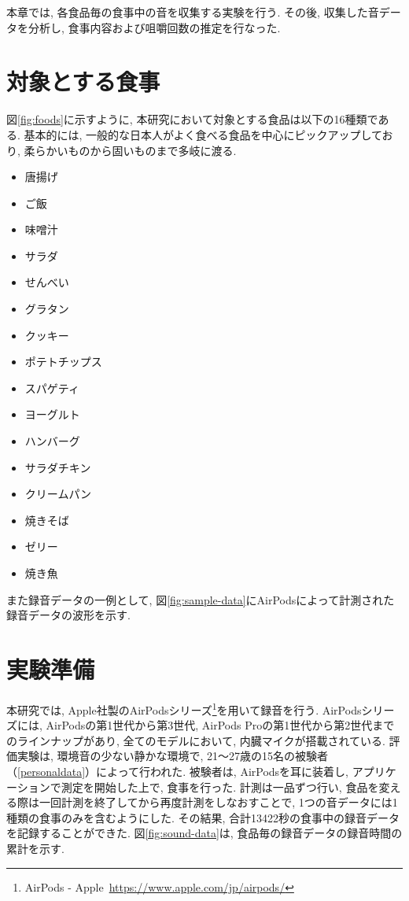 本章では, 各食品毎の食事中の音を収集する実験を行う. その後, 収集した音データを分析し, 食事内容および咀嚼回数の推定を行なった.

\section{対象とする食事}

図\ref{fig:foods}に示すように, 本研究において対象とする食品は以下の16種類である. 基本的には, 一般的な日本人がよく食べる食品を中心にピックアップしており, 柔らかいものから固いものまで多岐に渡る.

\begin{itemize}
    \item 唐揚げ
    \item ご飯
    \item 味噌汁
    \item サラダ
    \item せんべい
    \item グラタン
    \item クッキー
    \item ポテトチップス
    \item スパゲティ
    \item ヨーグルト
    \item ハンバーグ
    \item サラダチキン
    \item クリームパン
    \item 焼きそば
    \item ゼリー
    \item 焼き魚
\end{itemize}

また録音データの一例として, 図\ref{fig:sample-data}にAirPodsによって計測された録音データの波形を示す.

\section{実験準備}

本研究では, Apple社製のAirPodsシリーズ\footnote{AirPods - Apple~\url{https://www.apple.com/jp/airpods/}}を用いて録音を行う. AirPodsシリーズには, AirPodsの第1世代から第3世代, AirPods Proの第1世代から第2世代までのラインナップがあり, 全てのモデルにおいて, 内臓マイクが搭載されている. 評価実験は, 環境音の少ない静かな環境で, 21〜27歳の15名の被験者（\tablename\ref{personaldata}）によって行われた. 被験者は, AirPodsを耳に装着し, アプリケーションで測定を開始した上で, 食事を行った. 計測は一品ずつ行い, 食品を変える際は一回計測を終了してから再度計測をしなおすことで, 1つの音データには1種類の食事のみを含むようにした. その結果, 合計13422秒の食事中の録音データを記録することができた. 図\ref{fig:sound-data}は, 食品毎の録音データの録音時間の累計を示す.

